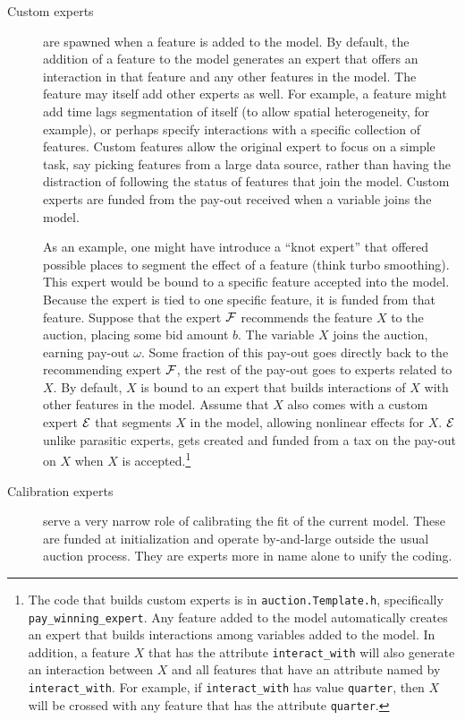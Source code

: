 \documentclass[12pt]{article}
\begin{document}
\begin{description}
\item[Custom experts] are spawned when a feature is added to the model.  By
 default, the addition of a feature to the model generates an expert that offers
 an interaction in that feature and any other features in the model.  The
 feature may itself add other experts as well.  For example, a feature might add
 time lags segmentation of itself (to allow spatial heterogeneity, for
 example), or perhaps specify interactions with a specific collection of
 features.  Custom features allow the original expert to focus on a simple task,
 say picking features from a large data source, rather than having the
 distraction of following the status of features that join the model.  Custom
 experts are funded from the pay-out received when a variable joins the model.

 As an example, one might have introduce a ``knot expert'' that offered possible
 places to segment the effect of a feature (think turbo smoothing).  This expert
 would be bound to a specific feature accepted into the model.  Because the
 expert is tied to one specific feature, it is funded from that feature.
  Suppose that the expert $\cal F$ recommends the feature $X$ to the auction,
 placing some bid amount $b$.  The variable $X$ joins the auction, earning
 pay-out $\omega$.  Some fraction of this pay-out goes directly back to the
 recommending expert $\cal F$, the rest of the pay-out goes to experts related to
 $X$.  By default, $X$ is bound to an expert that builds interactions of $X$
 with other features in the model.  Assume that $X$ also comes with a custom
 expert $\cal E$ that segments $X$ in the model, allowing nonlinear effects for
 $X$.  $\cal E$ unlike parasitic experts, gets created and funded from a tax on
 the pay-out on $X$ when $X$ is accepted.\footnote{The code that builds custom
 experts is in {\tt auction.Template.h}, specifically {\tt
 pay\_winning\_expert}.  Any feature added to the model automatically creates an
 expert that builds interactions among variables added to the model. In
 addition, a feature $X$ that has the attribute {\tt interact\_with} will also
 generate an interaction between $X$ and all features that have an attribute
 named by {\tt interact\_with}.  For example, if {\tt interact\_with} has value
 {\tt quarter}, then $X$ will be crossed with any feature that has the attribute
 {\tt quarter}.}

\item[Calibration experts] serve a very narrow role of calibrating the fit of
 the current model.  These are funded at initialization and operate by-and-large
 outside the usual auction process.  They are experts more in name alone to
 unify the coding.
\end{description}
\end{document}
